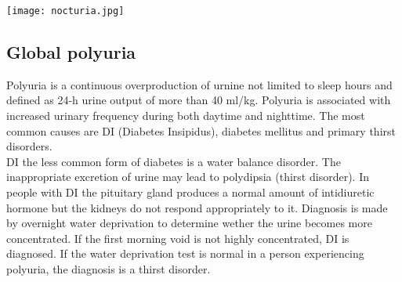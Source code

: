 \begin{center}
	\texttt{[image: nocturia.jpg]}
	\label{fig:alg_nocturia}
\end{center}

\subsection{Global polyuria}

Polyuria is a continuous overproduction of urnine not limited to sleep hours and defined as 24-h urine output of more than 40 ml/kg. Polyuria is associated with increased urinary frequency during both daytime and nighttime. The most common causes are \gls{DI} (Diabetes Insipidus), diabetes mellitus and primary thirst disorders. \\

\gls{DI} the less common form of diabetes is a water balance disorder. The inappropriate excretion of urine may lead to polydipsia (thirst disorder). In people with \gls{DI} the pituitary gland produces a normal amount of intidiuretic hormone but the kidneys do not respond appropriately to it. Diagnosis is made by overnight water deprivation to determine wether the urine becomes more concentrated. If the first morning void is not highly concentrated, \gls{DI} is diagnosed. If the water deprivation test is normal in a person experiencing polyuria, the diagnosis is a thirst disorder.  \textcite{polyuria_vs_overactive_bladder}

